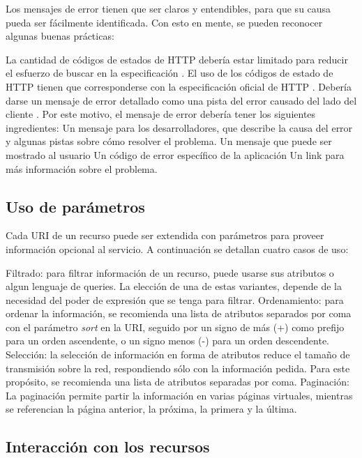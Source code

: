 Los mensajes de error tienen que ser claros y entendibles, para que su causa pueda ser fácilmente identificada. Con esto en mente, se pueden reconocer algunas buenas prácticas:
\begin{outline}
    \1 La cantidad de códigos de estados de HTTP debería estar limitado para reducir el esfuerzo de buscar en la especificación \cite{WAPID}.
    \1 El uso de los códigos de estado de HTTP tienen que corresponderse con la especificación oficial de HTTP \cite{HTTP}.
    \1 Debería darse un mensaje de error detallado como una pista del error causado del lado del cliente \cite{WAPID}. Por este motivo, el mensaje de error debería tener los siguientes ingredientes:
        \2 Un mensaje para los desarrolladores, que describe la causa del error y algunas pistas sobre cómo resolver el problema.
        \2 Un mensaje que puede ser mostrado al usuario
        \2 Un código de error específico de la aplicación
        \2 Un link para más información sobre el problema.
\end{outline}
\subsection[Uso de parámetros]{Uso de parámetros}

Cada URI de un recurso puede ser extendida con parámetros para proveer información opcional al servicio. A continuación se detallan cuatro casos de uso:
\begin{outline}
    \1 Filtrado: para filtrar información de un recurso, puede usarse sus atributos o algun lenguaje de queries. La elección de una de estas variantes, depende de la necesidad del poder de expresión que se tenga para filtrar. 
    \1 Ordenamiento: para ordenar la información, se recomienda \cite{BPRA} una lista de atributos separados por coma con el parámetro \textit{sort} en la URI, seguido por un signo de más (+) como prefijo para un orden ascendente, o un signo menos (-) para un orden descendente.
    \1 Selección: la selección de información en forma de atributos reduce el tamaño de transmisión sobre la red, respondiendo sólo con la información pedida. Para este propósito, se recomienda una lista de atributos separadas por coma.
    \1 Paginación: La paginación permite partir la información en varias páginas virtuales, mientras se referencian la página anterior, la próxima, la primera y la última. 
\end{outline}
\subsection[Interacción con los recursos]{Interacción con los recursos}

